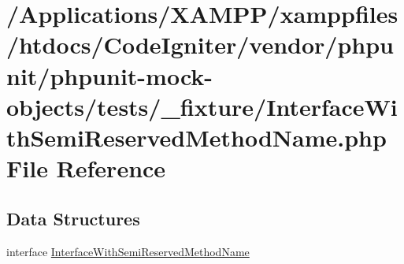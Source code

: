 \hypertarget{_interface_with_semi_reserved_method_name_8php}{}\section{/\+Applications/\+X\+A\+M\+P\+P/xamppfiles/htdocs/\+Code\+Igniter/vendor/phpunit/phpunit-\/mock-\/objects/tests/\+\_\+fixture/\+Interface\+With\+Semi\+Reserved\+Method\+Name.php File Reference}
\label{_interface_with_semi_reserved_method_name_8php}
\subsection*{Data Structures}
\begin{DoxyCompactItemize}
\item 
interface \mbox{\hyperlink{interface_interface_with_semi_reserved_method_name}{Interface\+With\+Semi\+Reserved\+Method\+Name}}
\end{DoxyCompactItemize}
